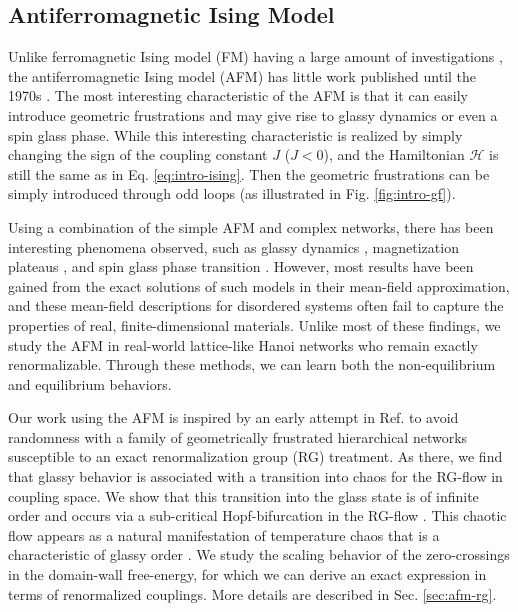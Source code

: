 \subsection{Antiferromagnetic Ising Model}
\label{sec:intro-afm}

Unlike ferromagnetic Ising model (FM) having a large amount of investigations \cite{niss2005history, mccoy2014two}, the antiferromagnetic Ising model (AFM) has little work published until the 1970s \cite{penney2003new}. The most interesting characteristic of the AFM is that it can easily introduce geometric frustrations and may give rise to glassy dynamics or even a spin glass phase. While this interesting characteristic is realized by simply changing the sign of the coupling constant $J$ ($J<0$), and the Hamiltonian $\mathcal{H}$ is still the same as in Eq. \ref{eq:intro-ising}. Then the geometric frustrations can be simply introduced through odd loops (as illustrated in Fig. \ref{fig:intro-gf}).

Using a combination of the simple AFM and complex networks, there has been interesting phenomena observed, such as glassy dynamics \cite{shokef2011}, magnetization plateaus \cite{ohanyan2003mag}, and spin glass phase transition \cite{herrero2008afm}. However, most results have been gained from the exact solutions of such models in their mean-field
approximation, and these mean-field descriptions for disordered systems often fail to capture the properties of real, finite-dimensional materials.  Unlike most of these findings, we study the AFM in real-world lattice-like Hanoi networks who remain exactly renormalizable. Through these methods, we can learn both the non-equilibrium and equilibrium behaviors. 

Our work using the AFM is inspired by an early attempt in Ref. \cite{mckay1982spin} to avoid randomness with a family of geometrically frustrated hierarchical networks susceptible to an exact renormalization group (RG) treatment. As there, we find that glassy behavior is associated
with a transition into chaos for the RG-flow in coupling space. We
show that this transition into the glass state is of infinite order
and occurs via a sub-critical Hopf-bifurcation in the RG-flow \cite{weinrib1983critical}.
This chaotic flow appears as a natural manifestation of temperature
chaos that is a characteristic of glassy order  \cite{bray1987chaotic, thomas2011zero}.
We study the scaling behavior of the zero-crossings in the domain-wall
free-energy, for which we can derive an exact expression in terms
of renormalized couplings. More details are described in Sec. \ref{sec:afm-rg}.



